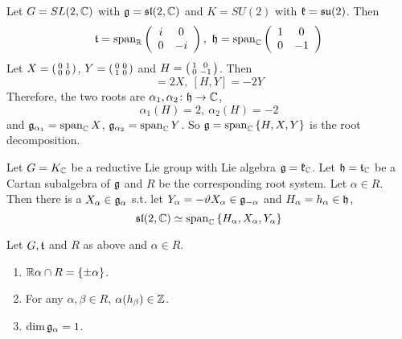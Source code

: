 \documentclass[a4paper,12pt]{article}
\begin{document}
	\begin{exam}
		Let $G = SL(2,\mathbb{C})$ with $\mathfrak{g} = \mathfrak{sl}(2,\mathbb{C})$ and $K  = SU(2)$ with $\mathfrak{k} = \mathfrak{su}(2)$. Then
		\begin{equation*}
			\mathfrak{t} = \operatorname{span}_{\mathbb{R}}\left(
					\begin{array}{cc}
						i & 0\\
						0 & -i
					\end{array}
				\right),~\mathfrak{h} = \operatorname{span}_{\mathbb{C}}\left(
					\begin{array}{cc}
						1 & 0\\
						0 & -1
					\end{array}
				\right)
		\end{equation*}
		Let $X = \left(\begin{smallmatrix}
					0 & 1 \\
					0 & 0
		\end{smallmatrix}\right)$, $Y = \left(\begin{smallmatrix}
					0 & 0 \\
					1 & 0
		\end{smallmatrix}\right)$ and $H = \left(\begin{smallmatrix}
					1 & 0 \\
					0 & -1
		\end{smallmatrix}\right)$. Then
		\begin{equation*}
			[H,X] = 2X,~[H,Y] = -2Y
		\end{equation*}
		Therefore, the two roots are $\alpha_1,\alpha_2 \colon \mathfrak{h} \rightarrow \mathbb{C}$, 
		\begin{equation*}
			\alpha_1(H) = 2,~\alpha_2(H)  = -2
		\end{equation*}
		and $\mathfrak{g}_{\alpha_1} = \operatorname{span}_{\mathbb{C}}X$, $\mathfrak{g}_{\alpha_2} = \operatorname{span}_{\mathbb{C}}Y$. So $\mathfrak{g} = \operatorname{span}_{\mathbb{C}}\left\{H,X,Y\right\}$ is the root decomposition.
	\end{exam}

	\begin{thm}
		Let $G = K_{\mathbb{C}}$ be a reductive Lie group with Lie algebra $\mathfrak{g} = \mathfrak{k}_{\mathbb{C}}$. Let $\mathfrak{h} = \mathfrak{t}_{\mathbb{C}}$ be a Cartan subalgebra of $\mathfrak{g}$ and $R$ be the corresponding root system. Let $\alpha \in R$. Then there is a $X_{\alpha} \in \mathfrak{g}_{\alpha}$ s.t. let $Y_{\alpha} = -\vartheta X_{\alpha} \in \mathfrak{g}_{-\alpha}$ and $H_{\alpha} = h_{\alpha} \in \mathfrak{h}$,
		\begin{equation*}
			\mathfrak{sl}(2,\mathbb{C}) \simeq \operatorname{span}_{\mathbb{C}}\left\{H_{\alpha},X_{\alpha},Y_{\alpha}\right\}
		\end{equation*}
	\end{thm}
	\begin{cor}
		Let $G,\mathfrak{t}$ and $R$ as above and $\alpha \in R$.
		\begin{enumerate}
			\item $\mathbb{R} \alpha \cap R = \left\{\pm \alpha\right\}$.
			\item For any $\alpha,\beta \in R$, $\alpha(h_{\beta}) \in \mathbb{Z}$.
			\item $\dim \mathfrak{g_{\alpha}} = 1$.
		\end{enumerate}
	\end{cor}
\end{document}
